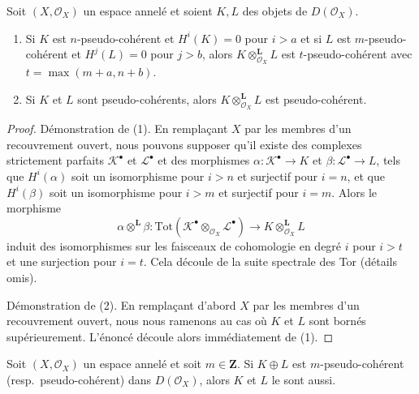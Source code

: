 \begin{lemma}

\label{lemma-tensor-pseudo-coherent}

Soit $(X, \mathcal{O}_X)$ un espace annelé et soient $K, L$ des objets de $D(\mathcal{O}_X)$.

\begin{enumerate}

\item Si $K$ est $n$-pseudo-cohérent et $H^i(K) = 0$ pour $i > a$
et si $L$ est $m$-pseudo-cohérent et $H^j(L) = 0$ pour $j > b$, alors
$K \otimes_{\mathcal{O}_X}^\mathbf{L} L$ est $t$-pseudo-cohérent avec $t = \max(m + a, n + b)$.
\item Si $K$ et $L$ sont pseudo-cohérents, alors
$K \otimes_{\mathcal{O}_X}^\mathbf{L} L$ est pseudo-cohérent.

\end{enumerate}

\end{lemma}

\begin{proof}
Démonstration de (1). En remplaçant $X$ par les membres d'un recouvrement ouvert, nous pouvons supposer qu'il existe des complexes strictement parfaits $\mathcal{K}^\bullet$ et $\mathcal{L}^\bullet$ et des morphismes $\alpha : \mathcal{K}^\bullet \to K$ et $\beta : \mathcal{L}^\bullet \to L$, tels que $H^i(\alpha)$ soit un isomorphisme pour $i > n$ et surjectif pour $i = n$, et que $H^i(\beta)$ soit un isomorphisme pour $i > m$ et surjectif pour $i = m$. Alors le morphisme $$
\alpha \otimes^\mathbf{L} \beta :
\text{Tot}(\mathcal{K}^\bullet \otimes_{\mathcal{O}_X} \mathcal{L}^\bullet)
\to K \otimes_{\mathcal{O}_X}^\mathbf{L} L
$$ induit des isomorphismes sur les faisceaux de cohomologie en degré $i$ pour $i > t$ et une surjection pour $i = t$. Cela découle de la suite spectrale des Tor (détails omis).

\medskip\noindent

Démonstration de (2). En remplaçant d'abord $X$ par les membres d'un recouvrement ouvert, nous nous ramenons au cas où $K$ et $L$ sont bornés supérieurement. L'énoncé découle alors immédiatement de (1).

\end{proof}

\begin{lemma}

\label{lemma-summands-pseudo-coherent}
Soit $(X, \mathcal{O}_X)$ un espace annelé et soit $m \in \mathbf{Z}$. Si $K \oplus L$ est $m$-pseudo-cohérent (resp.\ pseudo-cohérent) dans $D(\mathcal{O}_X)$, alors $K$ et $L$ le sont aussi.
\end{lemma}

